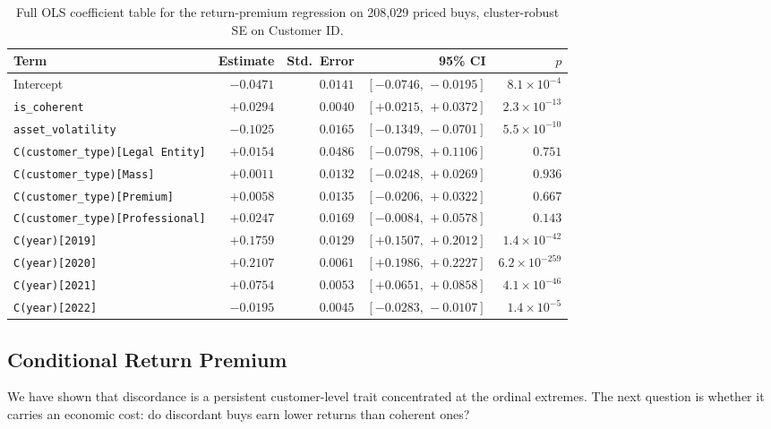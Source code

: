 \begin{table}[!t]
\centering
\small
\begin{tabular}{lrrrr}
\toprule
Term & Estimate & Std.\ Error & 95\% CI & $p$ \\
\midrule
Intercept                                & $-0.0471$ & $0.0141$ & $[-0.0746,\, -0.0195]$ & $8.1 \times 10^{-4}$ \\
\texttt{is\_coherent}                    & $+0.0294$ & $0.0040$ & $[+0.0215,\, +0.0372]$ & $2.3 \times 10^{-13}$ \\
\texttt{asset\_volatility}               & $-0.1025$ & $0.0165$ & $[-0.1349,\, -0.0701]$ & $5.5 \times 10^{-10}$ \\
\texttt{C(customer\_type)[Legal Entity]} & $+0.0154$ & $0.0486$ & $[-0.0798,\, +0.1106]$ & $0.751$ \\
\texttt{C(customer\_type)[Mass]}         & $+0.0011$ & $0.0132$ & $[-0.0248,\, +0.0269]$ & $0.936$ \\
\texttt{C(customer\_type)[Premium]}      & $+0.0058$ & $0.0135$ & $[-0.0206,\, +0.0322]$ & $0.667$ \\
\texttt{C(customer\_type)[Professional]} & $+0.0247$ & $0.0169$ & $[-0.0084,\, +0.0578]$ & $0.143$ \\
\texttt{C(year)[2019]}                   & $+0.1759$ & $0.0129$ & $[+0.1507,\, +0.2012]$ & $1.4 \times 10^{-42}$ \\
\texttt{C(year)[2020]}                   & $+0.2107$ & $0.0061$ & $[+0.1986,\, +0.2227]$ & $6.2 \times 10^{-259}$ \\
\texttt{C(year)[2021]}                   & $+0.0754$ & $0.0053$ & $[+0.0651,\, +0.0858]$ & $4.1 \times 10^{-46}$ \\
\texttt{C(year)[2022]}                   & $-0.0195$ & $0.0045$ & $[-0.0283,\, -0.0107]$ & $1.4 \times 10^{-5}$ \\
\bottomrule
\end{tabular}
\caption{Full OLS coefficient table for the return-premium regression on 208{,}029 priced buys, cluster-robust SE on Customer ID.}
\label{tab:return-premium-ols}
\end{table}

\subsection{Conditional Return Premium}
\label{sec:analysis:return}

We have shown that discordance is a persistent customer-level trait concentrated at the ordinal extremes. The next question is whether it carries an economic cost: do discordant buys earn lower returns than coherent ones?

